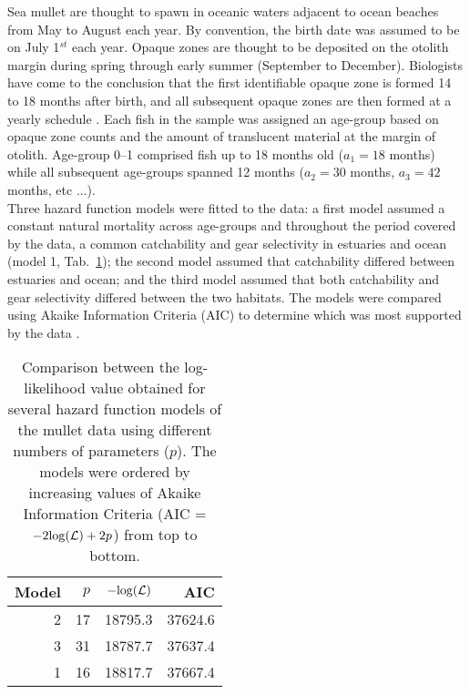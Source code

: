 \documentclass[12pt]{article}
\begin{document}
Sea mullet are thought to spawn in oceanic waters adjacent to ocean beaches from May to August each year. By convention, the birth date was assumed to be on July 1$^{st}$ each year. Opaque zones are thought to be deposited on the otolith margin during spring through early summer (September to December). Biologists have come to the conclusion that the first identifiable opaque zone is formed 14 to 18 months after birth, and all subsequent opaque zones are then formed at a yearly schedule \citep{Smith2003}. Each fish in the sample was assigned an age-group based on opaque zone counts and the amount of translucent material at the margin of otolith. Age-group 0--1 comprised fish up to 18 months old ($a_{1}=18$ months) while all subsequent age-groups spanned 12 months ($a_{2} = 30$ months, $a_{3}= 42$ months, etc ...).\\

Three hazard function models were fitted to the data: a first model assumed a constant natural mortality across age-groups and throughout the period covered by the data, a common catchability and gear selectivity in estuaries and ocean (model 1, Tab.~\ref{tab:MulletModelComparison}); the second model assumed that catchability differed between estuaries and ocean; and the third model assumed that both catchability and gear selectivity differed between the two habitats. The models were compared using Akaike Information Criteria (AIC) to determine which was most supported by the data \citep{Burnb03}.\\

\begin{table}[ht]
\centering
\begin{tabular}{rrrr}
  \hline
Model & $p$ & $-{\rm log}(\mathcal{L})$ & AIC \\ 
  \hline
   2 & 17 & 18795.3 & 37624.6 \\ 
   3 & 31 & 18787.7 & 37637.4 \\ 
   1 & 16 & 18817.7 & 37667.4 \\ 
   \hline
\end{tabular}
\caption{Comparison between the log-likelihood value obtained for several hazard function models of the mullet data using different numbers of parameters ($p$). The models were ordered by increasing values of Akaike Information Criteria (AIC =$-2 {\rm log}(\mathcal{L}) + 2p$) from top to bottom.} 
\label{tab:MulletModelComparison}
\end{table}
\end{document}
